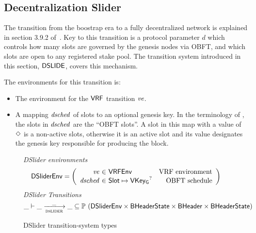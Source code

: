 \clearpage

\subsection{Decentralization Slider}
\label{sec:decentralization-slider}

The transition from the boostrap era to a fully decentralized network is explained in
section 3.9.2 of~\cite{delegation_design}.
Key to this transition is a protocol parameter $d$ which controls how many slots are governed by
the genesis nodes via OBFT, and which slots are open to any registered stake pool.
The transition system introduced in this section, $\mathsf{DSLIDE}$, covers this mechanism.

The environments for this transition is:
\begin{itemize}
  \item The environment for the $\mathsf{VRF}$ transition $\mathit{ve}$.
  \item A mapping $\mathit{dsched}$ of slots to an optional genesis key.
    In the terminology of \cite{delegation_design},
    the slots in $\mathit{dsched}$ are the ``OBFT slots''.
    A slot in this map with a value of $\Diamond$ is a non-active slots,
    otherwise it is an active slot and its value designates the genesis key
    responsible for producing the block.
\end{itemize}

\begin{figure}
  \emph{DSlider environments}
  \begin{equation*}
    \DSliderEnv =
    \left(
      \begin{array}{r@{~\in~}lr}
        \var{ve} & \VRFEnv & \text{VRF environment} \\
        \var{dsched} & \Slot\mapsto\VKeyGen^? & \text{OBFT schedule} \\
      \end{array}
    \right)
  \end{equation*}
  \emph{DSlider Transitions}
  \begin{equation*}
    \_ \vdash \var{\_} \trans{dslider}{\_} \var{\_} \subseteq
    \powerset (\DSliderEnv \times \BHeaderState \times \BHeader \times \BHeaderState)
  \end{equation*}
  \caption{DSlider transition-system types}
  \label{fig:ts-types:decent-slider}
\end{figure}

